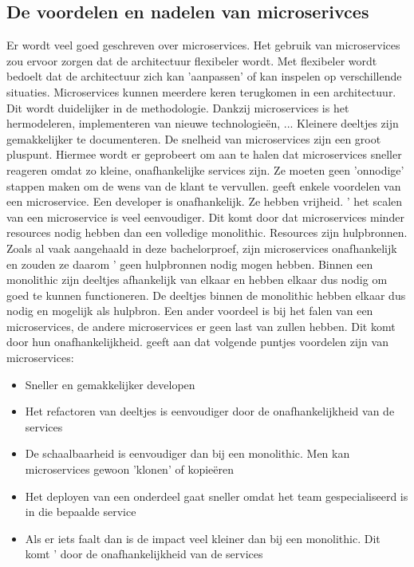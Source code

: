 \subsection{De voordelen en nadelen van microserivces}
Er wordt veel goed geschreven over microservices. Het gebruik van microservices zou ervoor zorgen dat de architectuur flexibeler wordt. Met flexibeler wordt bedoelt dat de architectuur zich kan 'aanpassen' of kan inspelen op verschillende situaties. Microservices kunnen meerdere keren terugkomen in een architectuur. Dit wordt duidelijker in de methodologie. Dankzij microservices is het hermodeleren, implementeren van nieuwe  technologieën, ... 
Kleinere deeltjes zijn gemakkelijker te documenteren. De snelheid van microservices zijn een groot pluspunt. Hiermee wordt er geprobeert om aan te halen dat microservices sneller reageren omdat zo kleine, onafhankelijke services zijn. Ze moeten geen 'onnodige' stappen maken om de  wens van de klant te vervullen. 
\textcite{Watts2018} geeft enkele voordelen van een microservice. Een developer is onafhankelijk. Ze hebben vrijheid. ' het scalen van een microservice is veel eenvoudiger. Dit komt door dat microservices minder resources nodig hebben dan een volledige monolithic. Resources zijn hulpbronnen. Zoals al vaak aangehaald in deze bachelorproef, zijn microservices onafhankelijk en zouden ze daarom ' geen hulpbronnen nodig mogen hebben. Binnen een monolithic zijn deeltjes afhankelijk van elkaar en hebben elkaar dus nodig om goed te kunnen functioneren. De deeltjes binnen de monolithic hebben elkaar dus nodig en mogelijk als hulpbron. Een ander voordeel is bij het falen van een microservices, de andere microservices er geen last van zullen hebben. Dit komt door hun onafhankelijkheid. 
\textcite{Benetis2016} geeft aan dat volgende puntjes voordelen zijn van microservices:
\begin{itemize}
	\item Sneller en gemakkelijker developen
	\item Het refactoren van deeltjes is eenvoudiger door de onafhankelijkheid van de services
	\item De schaalbaarheid is eenvoudiger dan bij een monolithic. Men kan microservices gewoon 'klonen' of kopieëren
	\item Het deployen van een onderdeel gaat sneller omdat het team gespecialiseerd is in die bepaalde service
	\item Als er iets faalt dan is de impact veel kleiner dan bij een monolithic. Dit komt ' door de onafhankelijkheid van de services
\end{itemize}
